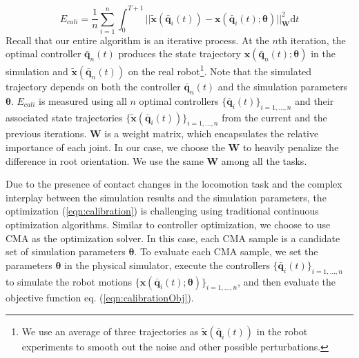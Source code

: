 \begin{equation}
  E_{cali}=\frac{1}{n}\sum_{i=1}^{n}\int_{0}^{T+1}||\tilde{\mathbf{x}}(\bar{\mathbf{q}}_i(t))-\mathbf{x}(\bar{\mathbf{q}}_i(t);\boldsymbol{\theta})||_{\mathbf{W}}^2\mathrm{d}t
  \label{eqn:calibrationObj}
\end{equation}
Recall that our entire algorithm is an iterative process. At the $n$th iteration, the optimal controller $\bar{\mathbf{q}}_n(t)$ produces the state trajectory $\mathbf{x}(\bar{\mathbf{q}}_n(t);\boldsymbol{\theta})$ in the simulation and $\tilde{\mathbf{x}}(\bar{\mathbf{q}}_n(t))$ on the real robot\footnote{We use an average of three trajectories as $\tilde{\mathbf{x}}(\bar{\mathbf{q}}_i(t))$ in the robot experiments to smooth out the noise and other possible perturbations.}. Note that the simulated trajectory depends on both the controller $\bar{\mathbf{q}}_n(t)$ and the simulation parameters $\boldsymbol{\theta}$. $E_{cali}$ is measured using all $n$ optimal controllers $\{\bar{\mathbf{q}}_i(t)\}_{i=1,...,n}$ and their associated state trajectories $\{\tilde{\mathbf{x}}(\bar{\mathbf{q}}_i(t))\}_{i=1,...,n}$ from the current and the previous iterations. $\mathbf{W}$ is a weight matrix, which encapsulates the relative importance of each joint. In our case, we choose the $\mathbf{W}$ to heavily penalize the difference in root orientation. We use the same $\mathbf{W}$ among all the tasks.

Due to the presence of contact changes in the locomotion task and the complex interplay between the simulation results and the simulation parameters, the optimization (\ref{eqn:calibration}) is challenging using traditional continuous optimization algorithms. Similar to controller optimization, we choose to use CMA as the optimization solver. In this case, each CMA sample is a candidate set of simulation parameters $\boldsymbol{\theta}$. To evaluate each CMA sample, we set the parameters $\boldsymbol{\theta}$ in the physical simulator, execute the controllers $\{\bar{\mathbf{q}}_i(t)\}_{i=1,...,n}$ to simulate the robot motions $\{\mathbf{x}(\bar{\mathbf{q}}_i(t);\boldsymbol{\theta})\}_{i=1,...,n}$, and then evaluate the objective function eq. (\ref{eqn:calibrationObj}).

